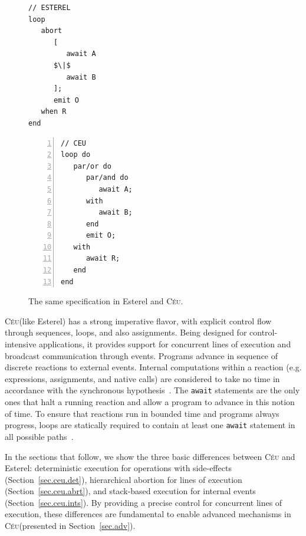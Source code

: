 \documentclass{acm_proc_article-sp}
\newcommand{\CEU}{\textsc{C\'{e}u}\xspace}
\newcommand{\code}[1] {{\small{\texttt{#1}}}}
\newcommand{\1}{\;}
\newcommand{\2}{\;\;}
\newcommand{\3}{\;\;\;}
\newcommand{\5}{\;\;\;\;\;}
\begin{document}
\begin{figure}[t]
\begin{minipage}[t]{0.44\linewidth}
\begin{lstlisting}[mathescape=true]
// ESTEREL
loop
   abort
      [
         await A
      $\|$
         await B
      ];
      emit O
   when R
end
\end{lstlisting}
\end{minipage}
%
\begin{minipage}[t]{0.55\linewidth}
\begin{lstlisting}[numbers=left,xleftmargin=3.5em]
// CEU
loop do
   par/or do
      par/and do
         await A;
      with
         await B;
      end
      emit O;
   with
      await R;
   end
end
\end{lstlisting}
\end{minipage}
\caption{ The same specification in Esterel and \CEU. %
{\small
}
\label{lst.abro}
}
\end{figure}

\CEU (like Esterel) has a strong imperative flavor, with explicit control flow 
through sequences, loops, and also assignments.
Being designed for control-intensive applications, it provides support for 
concurrent lines of execution and broadcast communication through events.
%
Programs advance in sequence of discrete reactions to external events.
Internal computations within a reaction (e.g. expressions, assignments, and 
native calls) are considered to take no time in accordance with the synchronous 
hypothesis~\cite{rp.hypothesis}.
The \code{await} statements are the only ones that halt a running reaction and 
allow a program to advance in this notion of time.
%
To ensure that reactions run in bounded time and programs always progress, 
loops are statically required to contain at least one \code{await} statement in 
all possible paths~\cite{ceu.sensys13,esterel.primer}.

In the sections that follow, we show the three basic differences between \CEU 
and Esterel: deterministic execution for operations with side-effects
(Section~\ref{sec.ceu.det}), hierarchical abortion for lines of execution 
(Section~\ref{sec.ceu.abrt}), and stack-based execution for internal events 
(Section~\ref{sec.ceu.ints}).
%
By providing a precise control for concurrent lines of execution, these 
differences are fundamental to enable advanced mechanisms in \CEU (presented in 
Section~\ref{sec.adv}).
\end{document}
